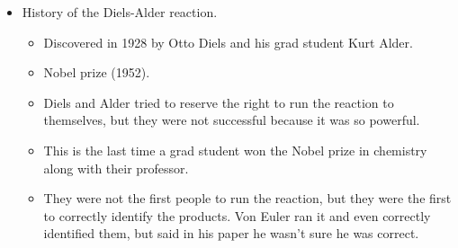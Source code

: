\documentclass[../notes.tex]{subfiles}
\begin{document}
\begin{itemize}
\begin{itemize}
\begin{figure}[h!]
\begin{subfigure}[b]{0.4\linewidth}
                \caption{Bromination of alkanes.}
                \label{fig:rxnDiagramAlkaneHalogenationb}
            \end{subfigure}
            \caption{Reaction diagrams for the RDS of halogenation of alkanes.}
            \label{fig:rxnDiagramAlkaneHalogenation}
        \end{figure}
        \begin{itemize}
            \item Forming  \emph{releases} $\SI[per-mode=symbol]{103}{\kilo\calorie\per\mole}$, and thus is exothermic.
            \item Forming  \emph{requires} $\SI[per-mode=symbol]{87}{\kilo\calorie\per\mole}$, and thus is endothermic.
            \item By Hammond's postulate, the transition state in bromination of alkanes (Figure \ref{fig:rxnDiagramAlkaneHalogenationb}) more closely resembles the products, while the transition state in chlorination of alkanes (Figure \ref{fig:rxnDiagramAlkaneHalogenationa}) more closely resembles the reactants.
            \item Thus, the transition states in the two bromination reactions, already more energetically separated than their chlorination cousins, are more sensitive to which type of radical is formed than the transition states in the two chlorination reactions.
        \end{itemize}
    \end{itemize}
    \item History of the Diels-Alder reaction.
    \begin{itemize}
        \item Discovered in 1928 by Otto Diels and his grad student Kurt Alder.
        \item Nobel prize (1952).
        \item Diels and Alder tried to reserve the right to run the reaction to themselves, but they were not successful because it was so powerful.
        \item This is the last time a grad student won the Nobel prize in chemistry along with their professor.
        \item They were not the first people to run the reaction, but they were the first to correctly identify the products. Von Euler ran it and even correctly identified them, but said in his paper he wasn't sure he was correct.

\end{itemize}
\end{itemize}
\end{document}
